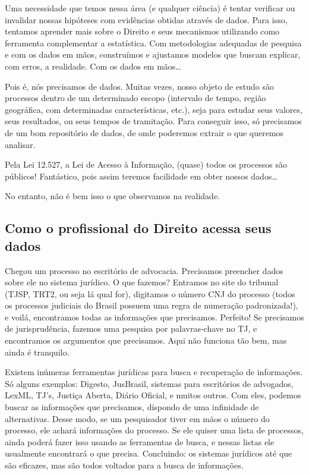 \documentclass[]{book}
\begin{document}
Uma necessidade que temos nessa área (e qualquer ciência) é tentar
verificar ou invalidar nossas hipóteses com evidências obtidas através
de dados. Para isso, tentamos aprender mais sobre o Direito e seus
mecanismos utilizando como ferramenta complementar a estatística. Com
metodologias adequadas de pesquisa e com os dados em mãos, construímos e
ajustamos modelos que buscam explicar, com erros, a realidade. Com os
dados em mãos\ldots{}

Pois é, nós precisamos de dados. Muitas vezes, nosso objeto de estudo
são processos dentro de um determinado escopo (intervalo de tempo,
região geográfica, com determinadas características, etc.), seja para
estudar seus valores, seus resultados, ou seus tempos de tramitação.
Para conseguir isso, só precisamos de um bom repositório de dados, de
onde poderemos extrair o que queremos analisar.

Pela Lei 12.527, a Lei de Acesso à Informação, (quase) todos os
processos são públicos! Fantástico, pois assim teremos facilidade em
obter nossos dados\ldots{}

No entanto, não é bem isso o que observamos na realidade.

\subsection{Como o profissional do Direito acessa seus
dados}\label{como-o-profissional-do-direito-acessa-seus-dados}

Chegou um processo no escritório de advocacia. Precisamos preencher
dados sobre ele no sistema jurídico. O que fazemos? Entramos no site do
tribunal (TJSP, TRT2, ou seja lá qual for), digitamos o número CNJ do
processo (todos os processos judiciais do Brasil possuem uma regra de
numeração padronizada!), e voilá, encontramos todas as informações que
precisamos. Perfeito! Se precisamos de jurisprudência, fazemos uma
pesquisa por palavras-chave no TJ, e encontramos os argumentos que
precisamos. Aqui não funciona tão bem, mas ainda é tranquilo.

Existem inúmeras ferramentas jurídicas para busca e recuperação de
informações. Só alguns exemplos: Digesto, JusBrasil, sistemas para
escritórios de advogados, LexML, TJ's, Justiça Aberta, Diário Oficial, e
muitos outros. Com eles, podemos buscar as informações que precisamos,
dispondo de uma infinidade de alternativas. Desse modo, se um
pesquisador tiver em mãos o número do processo, ele achará informações
do processo. Se ele quiser uma lista de processos, ainda poderá fazer
isso usando as ferramentas de busca, e nessas listas ele usualmente
encontrará o que precisa. Concluindo: os sistemas jurídicos até que são
eficazes, mas são todos voltados para a busca de informações.
\end{document}
